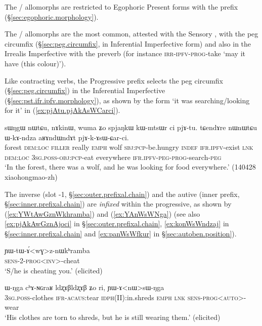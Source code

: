 The / allomorphs are restricted to Egophoric Present forms with the prefix  (§\ref{sec:egophoric.morphology}).

The / allomorphs are the most common, attested with the Sensory \hbox{,} with the peg circumfix (§\ref{sec:peg.circumfix}, in Inferential Imperfective form) and also in the Irrealis Imperfective with the preverb  (for instance  \textsc{irr}-\textsc{ipfv}-\textsc{prog}-take `may it have (this colour)').

 Like contracting verbs, the Progressive prefix selects the peg circumfix  (§\ref{sec:peg.circumfix}) in the Inferential Imperfective (§\ref{sec:pst.ifr.ipfv.morphology}), as shown by the form  `it was searching/looking for it' in (\ref{ex:pjAtu.pjAkAsWCarci}).

\begin{exe}
\ex \label{ex:pjAtu.pjAkAsWCarci}
\gll sɯŋgɯ nɯtɕu, nɤkinɯ, wuma ʑo spjaŋkɯ kɯ-mtsɯr ci pjɤ-tu. tɕendɤre nɯnɯtɕu ɯ-kɤ-ndza aʁɤndɯndɤt pjɤ-k-ɤsɯ-ɕar-ci. \\
forest \textsc{dem}:\textsc{loc} \textsc{filler} really \textsc{emph} wolf \textsc{sbj}:\textsc{pcp}-be.hungry \textsc{indef} \textsc{ifr}.\textsc{ipfv}-exist \textsc{lnk} \textsc{dem}:\textsc{loc} \textsc{3sg}.\textsc{poss}-\textsc{obj}:\textsc{pcp}-eat everywhere \textsc{ifr}.\textsc{ipfv}-\textsc{peg}-\textsc{prog}-search-\textsc{peg} \\
\glt `In the forest, there was a wolf, and he was looking for food everywhere.' (140428 xiaohongmao-zh)
\end{exe}

The inverse (slot -1, §\ref{sec:outer.prefixal.chain}) and the autive (inner prefix, §\ref{sec:inner.prefixal.chain}) are \textit{infixed} within the progressive, as shown by (\ref{ex:YWtAwGznWkhramba}) and (\ref{ex:YAnWsWNga})  (see also \ref{ex:pjAkAwGznAjoci} in §\ref{sec:outer.prefixal.chain}, \ref{ex:konWsWndzaj} in §\ref{sec:inner.prefixal.chain} and \ref{ex:panWsWfkur} in §\ref{sec:autoben.position}). 
 
\begin{exe}
\ex \label{ex:YWtAwGznWkhramba}
\gll ɲɯ-tɯ-ɤ́<wɣ>z-nɯkʰramba \\
\textsc{sens}-2-\textsc{prog}<\textsc{inv}>-cheat \\
\glt `S/he is cheating you.' (elicited)
\end{exe} 
 \largerpage
\begin{exe}
\ex \label{ex:YAnWsWNga}
\gll ɯ-ŋga cʰɤ-ɴɢraʁ ldʐɤβldʐɤβ ʑo ri, ɲɯ-ɤ<nɯ>sɯ-ŋga \\
\textsc{3sg}.\textsc{poss}-clothes \textsc{ifr}-\textsc{acaus}:tear \textsc{idph}(II):in.shreds \textsc{emph} \textsc{lnk} \textsc{sens}-\textsc{prog}<\textsc{auto}>-wear \\
\glt `His clothes are torn to shreds, but he is still wearing them.' (elicited)
\end{exe}

